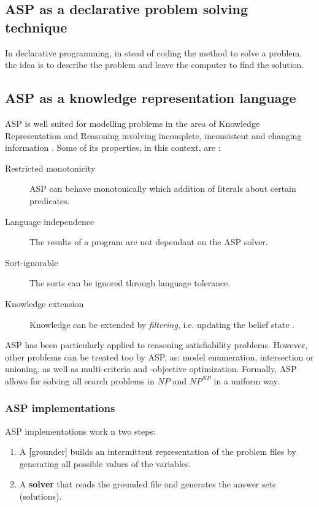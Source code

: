 \subsection{ASP as a declarative problem solving technique}

In declarative programming, in stead of coding the method to solve a problem, the idea is to describe the problem and leave the computer to find the solution.

\subsection{ASP as a knowledge representation language}

ASP is well suited for modelling problems in the area of Knowledge Representation and Reasoning involving incomplete, inconsistent and changing information \citep{Schaub13_ASPBoCo}. Some of its properties, in this context, are \citep{Todorova2006_CKASP}:

\begin{description}
\item[Restricted monotonicity] ASP can behave monotonically which addition of literals about certain predicates.
\item[Language independence] The results of a program are not dependant on the ASP solver.
\item[Sort-ignorable] The sorts can be ignored through language tolerance. %
\item[Knowledge extension] Knowledge can be extended by \textit{filtering}, i.e. updating the belief state \citep{Amir2003_LogFil}.
\end{description}

ASP has been particularly applied to reasoning satisfiability problems.
However, other problems can be treated too by ASP, as: model enumeration, intersection or unioning, as well as multi-criteria and -objective optimization. 
Formally, ASP allows for solving all search problems in $NP$ and $NP^{NP}$ in a uniform way. 


\subsubsection{ASP implementations}
ASP implementations work n two steps:

\begin{enumerate}
\item A \textbf[grounder] builds an intermittent representation of the problem files by generating all possible values of the variables.
\item A \textbf{solver} that reads the grounded file and generates the answer sets (solutions).
\end{enumerate}

